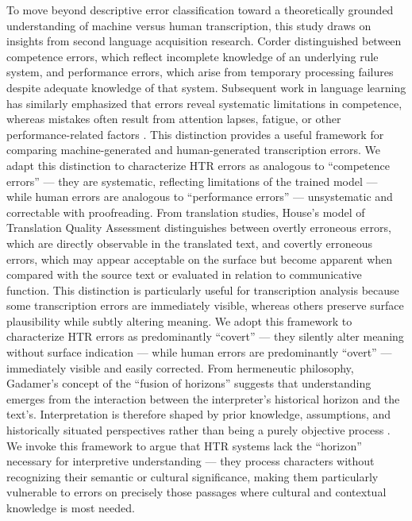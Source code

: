 \documentclass[final]{anthology-ch} %
\begin{document}
To move beyond descriptive error classification toward a theoretically grounded understanding of machine versus human transcription, this study draws on insights from second language acquisition research. Corder \cite{corder1967significance} distinguished between competence errors, which reflect incomplete knowledge of an underlying rule system, and performance errors, which arise from temporary processing failures despite adequate knowledge of that system. Subsequent work in language learning has similarly emphasized that errors reveal systematic limitations in competence, whereas mistakes often result from attention lapses, fatigue, or other performance-related factors \cite{james2013errors}. This distinction provides a useful framework for comparing machine-generated and human-generated transcription errors. We adapt this distinction to characterize HTR errors as analogous to \enquote{competence errors} --- they are systematic, reflecting limitations of the trained model --- while human errors are analogous to \enquote{performance errors} --- unsystematic and correctable with proofreading. From translation studies, House's \cite{house1997translation, house2015translation} model of Translation Quality Assessment distinguishes between overtly erroneous errors, which are directly observable in the translated text, and covertly erroneous errors, which may appear acceptable on the surface but become apparent when compared with the source text or evaluated in relation to communicative function. This distinction is particularly useful for transcription analysis because some transcription errors are immediately visible, whereas others preserve surface plausibility while subtly altering meaning. We adopt this framework to characterize HTR errors as predominantly \enquote{covert} --- they silently alter meaning without surface indication --- while human errors are predominantly \enquote{overt} --- immediately visible and easily corrected. From hermeneutic philosophy, Gadamer's concept of the \enquote{fusion of horizons} suggests that understanding emerges from the interaction between the interpreter's historical horizon and the text's. Interpretation is therefore shaped by prior knowledge, assumptions, and historically situated perspectives rather than being a purely objective process \cite{gadamer2013truth}. We invoke this framework to argue that HTR systems lack the \enquote{horizon} necessary for interpretive understanding --- they process characters without recognizing their semantic or cultural significance, making them particularly vulnerable to errors on precisely those passages where cultural and contextual knowledge is most needed.
\end{document}
